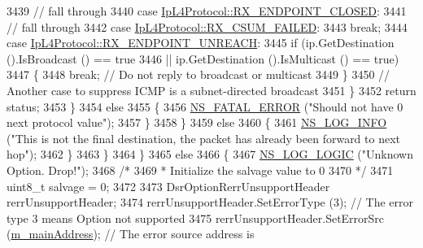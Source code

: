 \begin{DoxyCode}
3439                     \textcolor{comment}{// fall through}
3440                     \textcolor{keywordflow}{case} \hyperlink{classns3_1_1IpL4Protocol_afd3744c89902fff232e2fd45f558c80eac7f4577d3ab1a219d6cb2b6964c49afd}{IpL4Protocol::RX\_ENDPOINT\_CLOSED}:
3441                     \textcolor{comment}{// fall through}
3442                     \textcolor{keywordflow}{case} \hyperlink{classns3_1_1IpL4Protocol_afd3744c89902fff232e2fd45f558c80eaba0111c02656760e18ca30479e297b07}{IpL4Protocol::RX\_CSUM\_FAILED}:
3443                       \textcolor{keywordflow}{break};
3444                     \textcolor{keywordflow}{case} \hyperlink{classns3_1_1IpL4Protocol_afd3744c89902fff232e2fd45f558c80ea00e3d2a534b8bd353395254c0735948b}{IpL4Protocol::RX\_ENDPOINT\_UNREACH}:
3445                       \textcolor{keywordflow}{if} (ip.GetDestination ().IsBroadcast () == \textcolor{keyword}{true}
3446                           || ip.GetDestination ().IsMulticast () == \textcolor{keyword}{true})
3447                         \{
3448                           \textcolor{keywordflow}{break};       \textcolor{comment}{// Do not reply to broadcast or multicast}
3449                         \}
3450                       \textcolor{comment}{// Another case to suppress ICMP is a subnet-directed broadcast}
3451                     \}
3452                   \textcolor{keywordflow}{return} status;
3453                 \}
3454               \textcolor{keywordflow}{else}
3455                 \{
3456                   \hyperlink{group__fatal_ga5131d5e3f75d7d4cbfd706ac456fdc85}{NS\_FATAL\_ERROR} (\textcolor{stringliteral}{"Should not have 0 next protocol value"});
3457                 \}
3458             \}
3459           \textcolor{keywordflow}{else}
3460             \{
3461               \hyperlink{group__logging_gafbd73ee2cf9f26b319f49086d8e860fb}{NS\_LOG\_INFO} (\textcolor{stringliteral}{"This is not the final destination, the packet has already been
       forward to next hop"});
3462             \}
3463         \}
3464     \}
3465   \textcolor{keywordflow}{else}
3466     \{
3467       \hyperlink{group__logging_ga88acd260151caf2db9c0fc84997f45ce}{NS\_LOG\_LOGIC} (\textcolor{stringliteral}{"Unknown Option. Drop!"});
3468       \textcolor{comment}{/*}
3469 \textcolor{comment}{       * Initialize the salvage value to 0}
3470 \textcolor{comment}{       */}
3471       uint8\_t salvage = 0;
3472 
3473       DsrOptionRerrUnsupportHeader rerrUnsupportHeader;
3474       rerrUnsupportHeader.SetErrorType (3);               \textcolor{comment}{// The error type 3 means Option not supported}
3475       rerrUnsupportHeader.SetErrorSrc (\hyperlink{classns3_1_1dsr_1_1DsrRouting_a73182b5edee2d8460f28855e058fc9a0}{m\_mainAddress});       \textcolor{comment}{// The error source address is
}
\end{DoxyCode}
